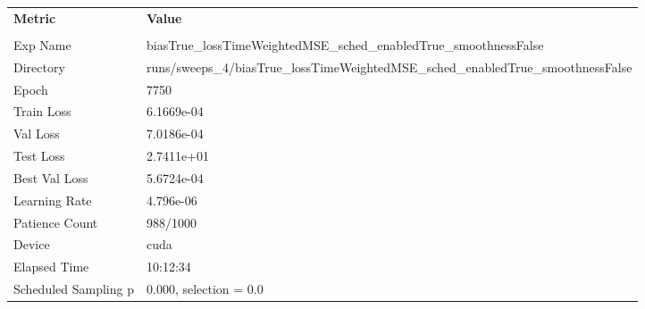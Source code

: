 \begin{tabular}{|l|l|}
\hline
\textbf{Metric} & \textbf{Value} \\\\
Exp Name & biasTrue_lossTimeWeightedMSE_sched_enabledTrue_smoothnessFalse \\ 
Directory & runs/sweeps_4/biasTrue_lossTimeWeightedMSE_sched_enabledTrue_smoothnessFalse \\ 
Epoch & 7750 \\ 
Train Loss & 6.1669e-04 \\ 
Val Loss & 7.0186e-04 \\ 
Test Loss & 2.7411e+01 \\ 
Best Val Loss & 5.6724e-04 \\ 
Learning Rate & 4.796e-06 \\ 
Patience Count & 988/1000 \\ 
Device & cuda \\ 
Elapsed Time & 10:12:34 \\ 
Scheduled Sampling p & 0.000, selection = 0.0 \\ 
\hline
\end{tabular}